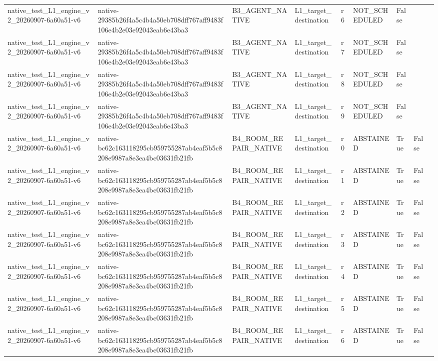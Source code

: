 \begin{tabular}{lllllllll}
native\_test\_L1\_engine\_v2\_20260907-6a60a51-v6 & native-29385b26f4a5c4b4a50eb708dff767aff9483f106e4b2e03e92043eab6e43ba3 & B3\_AGENT\_NATIVE & L1\_target\_destination & r6 & NOT\_SCHEDULED & False &  &  \\
native\_test\_L1\_engine\_v2\_20260907-6a60a51-v6 & native-29385b26f4a5c4b4a50eb708dff767aff9483f106e4b2e03e92043eab6e43ba3 & B3\_AGENT\_NATIVE & L1\_target\_destination & r7 & NOT\_SCHEDULED & False &  &  \\
native\_test\_L1\_engine\_v2\_20260907-6a60a51-v6 & native-29385b26f4a5c4b4a50eb708dff767aff9483f106e4b2e03e92043eab6e43ba3 & B3\_AGENT\_NATIVE & L1\_target\_destination & r8 & NOT\_SCHEDULED & False &  &  \\
native\_test\_L1\_engine\_v2\_20260907-6a60a51-v6 & native-29385b26f4a5c4b4a50eb708dff767aff9483f106e4b2e03e92043eab6e43ba3 & B3\_AGENT\_NATIVE & L1\_target\_destination & r9 & NOT\_SCHEDULED & False &  &  \\
native\_test\_L1\_engine\_v2\_20260907-6a60a51-v6 & native-bc62c163118295cb959755287ab4eaf5b5c8208e9987a8e3ea4bc03631fb21fb & B4\_ROOM\_REPAIR\_NATIVE & L1\_target\_destination & r0 & ABSTAINED & True & False &  \\
native\_test\_L1\_engine\_v2\_20260907-6a60a51-v6 & native-bc62c163118295cb959755287ab4eaf5b5c8208e9987a8e3ea4bc03631fb21fb & B4\_ROOM\_REPAIR\_NATIVE & L1\_target\_destination & r1 & ABSTAINED & True & False &  \\
native\_test\_L1\_engine\_v2\_20260907-6a60a51-v6 & native-bc62c163118295cb959755287ab4eaf5b5c8208e9987a8e3ea4bc03631fb21fb & B4\_ROOM\_REPAIR\_NATIVE & L1\_target\_destination & r2 & ABSTAINED & True & False &  \\
native\_test\_L1\_engine\_v2\_20260907-6a60a51-v6 & native-bc62c163118295cb959755287ab4eaf5b5c8208e9987a8e3ea4bc03631fb21fb & B4\_ROOM\_REPAIR\_NATIVE & L1\_target\_destination & r3 & ABSTAINED & True & False &  \\
native\_test\_L1\_engine\_v2\_20260907-6a60a51-v6 & native-bc62c163118295cb959755287ab4eaf5b5c8208e9987a8e3ea4bc03631fb21fb & B4\_ROOM\_REPAIR\_NATIVE & L1\_target\_destination & r4 & ABSTAINED & True & False &  \\
native\_test\_L1\_engine\_v2\_20260907-6a60a51-v6 & native-bc62c163118295cb959755287ab4eaf5b5c8208e9987a8e3ea4bc03631fb21fb & B4\_ROOM\_REPAIR\_NATIVE & L1\_target\_destination & r5 & ABSTAINED & True & False &  \\
native\_test\_L1\_engine\_v2\_20260907-6a60a51-v6 & native-bc62c163118295cb959755287ab4eaf5b5c8208e9987a8e3ea4bc03631fb21fb & B4\_ROOM\_REPAIR\_NATIVE & L1\_target\_destination & r6 & ABSTAINED & True & False &  \\

\end{tabular}
